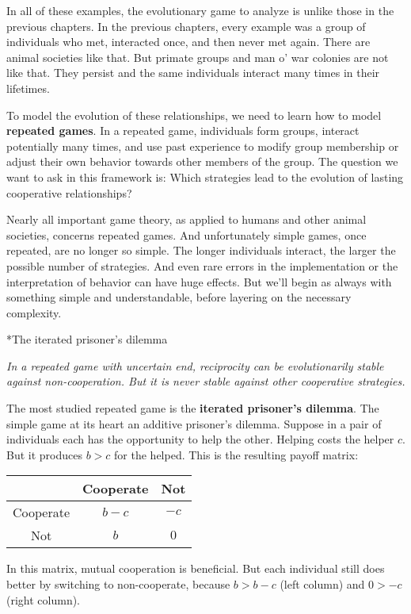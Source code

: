 \documentclass[10pt,reqno]{amsbook}
\makeatletter
\newcommand{\bemph}[1]{{\textbf{\textcolor{bemphcol}{#1}}}}
\renewcommand\section{\@startsection{section}{1}
\z@{.7\linespacing\@plus\linespacing}{.5\linespacing}
{\large\bfseries\itshape}}
\numberwithin{equation}{chapter}
\newenvironment{precis}
{\noi\itshape}
{\vspace{6pt}}
\newcommand{\noi}{\noindent}
\makeatother
\begin{document}
In all of these examples, the evolutionary game to analyze is unlike those in the previous chapters. In the previous chapters, every example was a group of individuals who met, interacted once, and then never met again. There are animal societies like that. But primate groups and man o' war colonies are not like that. They persist and the same individuals interact many times in their lifetimes. 

To model the evolution of these relationships, we need to learn how to model \bemph{repeated games}. In a repeated game, individuals form groups, interact potentially many times, and use past experience to modify group membership or adjust their own behavior towards other members of the group. The question we want to ask in this framework is: Which strategies lead to the evolution of lasting cooperative relationships?

Nearly all important game theory, as applied to humans and other animal societies, concerns repeated games. And unfortunately simple games, once repeated, are no longer so simple. The longer individuals interact, the larger the possible number of strategies. And even rare errors in the implementation  or the interpretation of behavior can have huge effects. But we'll begin as always with something simple and understandable, before layering on the necessary complexity.

\section*{The iterated prisoner's dilemma}

\begin{precis}In a repeated game with uncertain end, reciprocity can be evolutionarily stable against non-cooperation. But it is never stable against other cooperative strategies.\end{precis}

The most studied repeated game is the \bemph{iterated prisoner's dilemma}. The simple game at its heart an additive prisoner's dilemma. Suppose in a pair of individuals each has the opportunity to help the other. Helping costs the helper $c$. But it produces $b>c$ for the helped. This is the resulting payoff matrix:
\begin{center}
	\begin{tabular}{c|cc}
		& Cooperate & Not \\
		\hline
Cooperate & $b-c$ & $-c$ \\
	Not & $b$ & $0$ 
	\end{tabular}
\end{center}
In this matrix, mutual cooperation is beneficial. But each individual still does better by switching to non-cooperate, because $b>b-c$ (left column) and $0>-c$ (right column).
\end{document}
